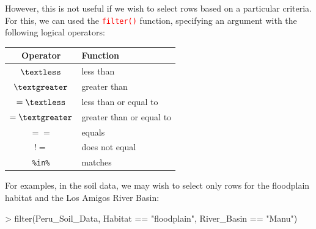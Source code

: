 \documentclass[a4paper,12pt]{article}
\newcommand\code[1]{\textcolor{red}{\texttt{#1}}}
\begin{document}
However, this is not useful if we wish to select rows based on a particular criteria. For this, we can used the \code{filter()} function, specifying an argument with the following logical operators:

\begin{table}[h]
	\centering
	\begin{tabular}{cl}
		
		Operator & Function \\ \hline
		$\textless$ & less than \\
		$\textgreater$ & greater than\\
		$=\textless$ & less than or equal to\\
		$=\textgreater$ & greater than or equal to\\
		$==$ & equals \\
		$!=$ & does not equal \\
		\texttt{\%in\%} & matches \\

	\end{tabular}
	 
	\label{tbl:Boolean}
\end{table}

For examples, in the soil data, we may wish to select only rows for the floodplain habitat and the Los Amigos River Basin:

\begin{shaded}
\begin{Schunk}
\begin{Sinput}
> filter(Peru_Soil_Data, Habitat == "floodplain", River_Basin == "Manu")
\end{Sinput}
\end{Schunk}
\end{shaded}

\end{document}
